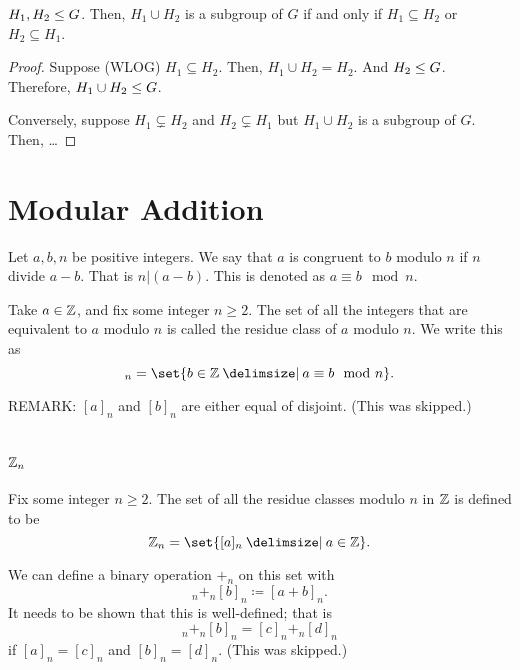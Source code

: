 \documentclass[11pt]{penrose}
\begin{document}
\begin{nthm}
    $H_1, H_2 \mathrel{\leq} G$. Then, $H_1 \cup H_2$ is a subgroup of $G$ if and only if $H_1 \subseteq H_2$ or $H_2 \subseteq H_1$.
\end{nthm}
\begin{proof}
    Suppose (WLOG) $H_1 \subseteq H_2$. Then, $H_1 \cup H_2 = H_2$. And $H_2 \mathrel{\leq} G$. Therefore, $H_1 \cup H_2 \mathrel{\leq} G$.

    Conversely, suppose $H_1 \subsetneq H_2$ and $H_2 \subsetneq H_1$ but $H_1 \cup H_2$ is a subgroup of $G$. Then, \dots
\end{proof}

\section{Modular Addition}

\begin{ndfn}
    Let $a, b, n$ be positive integers. We say that $a$ is congruent to $b$ modulo $n$ if $n$ divide $a-b$. That is $n | (a-b)$. This is denoted as $a \equiv b \mod n$.
\end{ndfn}

\begin{ndfn}
    Take $a \in \mathbb{Z}$, and fix some integer $n \geq 2$. The set of all the integers that are equivalent to $a$ modulo $n$ is called the residue class of $a$ modulo $n$. We write this as
    \begin{equation}
        [a]_n = \set{b \in \Z \st a \equiv b \mod n}.
    \end{equation}
\end{ndfn}

REMARK: $[a]_n$ and  $[b]_n$ are either equal of disjoint. (This was skipped.)

\section{$\mathbb{Z}_n$}
\begin{ndfn}
    Fix some integer $n \geq 2$. The set of all the residue classes modulo $n$ in $\mathbb{Z}$ is defined to be
    \begin{equation}
        \Z_n = \set{[a]_n \st a \in \Z}.
    \end{equation}
\end{ndfn}

We can define a binary operation $+_n$ on this set with
\begin{equation}
    [a]_n +_n [b]_n \coloneq [a + b]_n.
\end{equation}
It needs to be shown that this is well-defined; that is
\begin{equation}
    [a]_n +_n [b]_n = [c]_n +_n [d]_n
\end{equation}
if $[a]_n = [c]_n$ and $[b]_n = [d]_n$. (This was skipped.)
\end{document}
